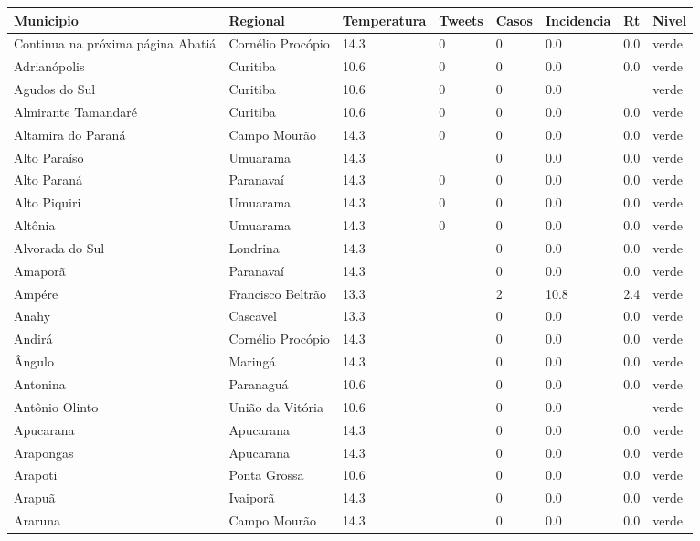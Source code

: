 \begin{longtable}{l|lllllll}
  \hline
Municipio & Regional & Temperatura & Tweets & Casos & Incidencia & Rt & Nivel \\ 
  \hline
\endhead
\hline
{\footnotesize Continua na próxima página}
\endfoot
\endlastfoot
Abatiá & Cornélio Procópio & 14.3 & 0 & 0 & 0.0 & 0.0 & verde \\ 
  Adrianópolis & Curitiba & 10.6 & 0 & 0 & 0.0 & 0.0 & verde \\ 
  Agudos do Sul & Curitiba & 10.6 & 0 & 0 & 0.0 &  & verde \\ 
  Almirante Tamandaré & Curitiba & 10.6 & 0 & 0 & 0.0 & 0.0 & verde \\ 
  Altamira do Paraná & Campo Mourão & 14.3 & 0 & 0 & 0.0 & 0.0 & verde \\ 
  Alto Paraíso & Umuarama & 14.3 &  & 0 & 0.0 & 0.0 & verde \\ 
  Alto Paraná & Paranavaí & 14.3 & 0 & 0 & 0.0 & 0.0 & verde \\ 
  Alto Piquiri & Umuarama & 14.3 & 0 & 0 & 0.0 & 0.0 & verde \\ 
  Altônia & Umuarama & 14.3 & 0 & 0 & 0.0 & 0.0 & verde \\ 
  Alvorada do Sul & Londrina & 14.3 &  & 0 & 0.0 & 0.0 & verde \\ 
  Amaporã & Paranavaí & 14.3 &  & 0 & 0.0 & 0.0 & verde \\ 
  Ampére & Francisco Beltrão & 13.3 &  & 2 & 10.8 & 2.4 & verde \\ 
  Anahy & Cascavel & 13.3 &  & 0 & 0.0 & 0.0 & verde \\ 
  Andirá & Cornélio Procópio & 14.3 &  & 0 & 0.0 & 0.0 & verde \\ 
  Ângulo & Maringá & 14.3 &  & 0 & 0.0 & 0.0 & verde \\ 
  Antonina & Paranaguá & 10.6 &  & 0 & 0.0 & 0.0 & verde \\ 
  Antônio Olinto & União da Vitória & 10.6 &  & 0 & 0.0 &  & verde \\ 
  Apucarana & Apucarana & 14.3 &  & 0 & 0.0 & 0.0 & verde \\ 
  Arapongas & Apucarana & 14.3 &  & 0 & 0.0 & 0.0 & verde \\ 
  Arapoti & Ponta Grossa & 10.6 &  & 0 & 0.0 & 0.0 & verde \\ 
  Arapuã & Ivaiporã & 14.3 &  & 0 & 0.0 & 0.0 & verde \\ 
  Araruna & Campo Mourão & 14.3 &  & 0 & 0.0 & 0.0 & verde \\ 

\end{longtable}

